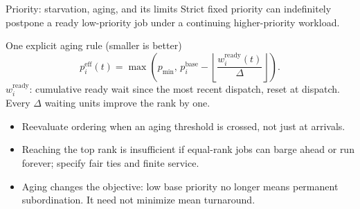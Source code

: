 \documentclass[aspectratio=169,11pt]{beamer}
\begin{document}
\begin{frame}{Priority: starvation, aging, and its limits}
  \small Strict fixed priority can indefinitely postpone a ready low-priority job under a continuing higher-priority workload.
  \begin{block}{One explicit aging rule (smaller is better)}
    \[
      p_i^{\mathrm{eff}}(t)=\max\!\left(p_{\min},\,
        p_i^{\mathrm{base}}-\left\lfloor\frac{w_i^{\mathrm{ready}}(t)}{\Delta}\right\rfloor\right).
    \]
    $w_i^{\mathrm{ready}}$: cumulative ready wait since the most recent dispatch, reset at dispatch. Every $\Delta$ waiting units improve the rank by one.
  \end{block}
  \begin{itemize}
    \item Reevaluate ordering when an aging threshold is crossed, not just at arrivals.
    \item Reaching the top rank is insufficient if equal-rank jobs can barge ahead or run forever; specify fair ties and finite service.
    \item Aging changes the objective: low base priority no longer means permanent subordination. It need not minimize mean turnaround.
  \end{itemize}
\end{frame}
\end{document}
